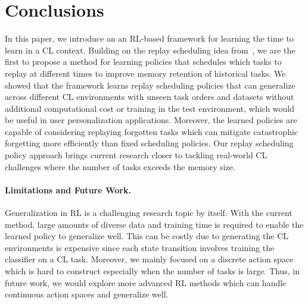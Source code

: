 
\section{Conclusions}\label{paperD:sec:conclusions}

In this paper, we introduce an an RL-based framework for learning the time to learn in a CL context. Building on the replay scheduling idea from~, we are the first to propose a method for learning policies that schedules which tasks to replay at different times to improve memory retention of historical tasks. We showed that the framework learns replay scheduling policies that can generalize across different CL environments with unseen task orders and datasets without additional computational cost or training in the test environment, which would be useful in user personalization applications. Moreover, the learned policies are capable of considering replaying forgotten tasks which can mitigate catastrophic forgetting more efficiently than fixed scheduling policies. Our replay scheduling policy approach brings current research closer to tackling real-world CL challenges where the number of tasks exceeds the memory size.


\vspace{-3mm}
\paragraph{Limitations and Future Work.} 
Generalization in RL is a challenging research topic by itself. With the current method, large amounts of diverse data and training time is required to enable the learned policy to generalize well. This can be costly due to generating the CL environments is expensive since each state transition involves training the classifier on a CL task. 
Moreover, we mainly focused on a discrete action space which is hard to construct especially when the number of tasks is large. Thus, in future work, we would explore more advanced RL methods which can handle continuous action spaces and generalize well.  

